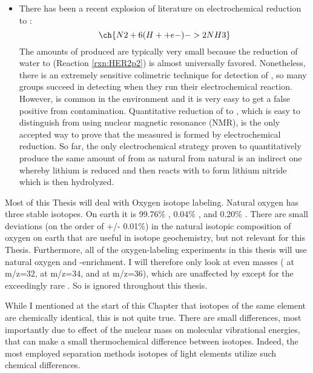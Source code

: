 \begin{itemize}
	\item 
	There has been a recent explosion of literature on electrochemical  reduction to :
	\begin{equation}
	\ch{N2 + 6 (H+ + e- ) -> 2 NH3} 
	\end{equation}
	The amounts of  produced are typically very small because the reduction of water to  (Reaction \ref{rxn:HER2p2}) is almost universally favored. Nonetheless, there is an extremely sensitive colimetric technique for detection of , so many groups succeed in detecting  when they run their electrochemical reaction. However,  is common in the environment and it is very easy to get a false positive from  contamination. Quantitative reduction of  to , which is easy to distinguish from  using nuclear magnetic resonance (NMR), is the only accepted way to prove that the measured  is formed by electrochemical  reduction\cite{Andersen2019}. So far, the only electrochemical strategy proven to quantitatively produce the same amount of  from  as natural  from natural  is an indirect one whereby lithium is reduced and then reacts with  to form lithium nitride which is then hydrolyzed\cite{Tsuneto1994, Andersen2019}.
\end{itemize}

Most of this Thesis will deal with Oxygen isotope labeling. Natural oxygen has three stable isotopes. On earth it is 99.76\% , 0.04\% , and 0.20\% \cite{Harnung2012}. There are small deviations (on the order of +/- 0.01\%) in the natural isotopic composition of oxygen on earth that are useful in isotope geochemistry, but not relevant for this Thesis. Furthermore, all of the oxygen-labeling experiments in this thesis will use natural oxygen and -enrichment. I will therefore only look at even masses ( at m/z=32,  at m/z=34, and  at m/z=36), which are unaffected by  except for the exceedingly rare . So  is ignored throughout this thesis.

While I mentioned at the start of this Chapter that isotopes of the same element are chemically identical, this is not quite true. There are small differences, most importantly due to effect of the nuclear mass on molecular vibrational energies, that can make a small thermochemical difference between isotopes. Indeed, the most employed separation methods isotopes of light elements utilize such chemical differences.\cite{IsotopeSeparation}

